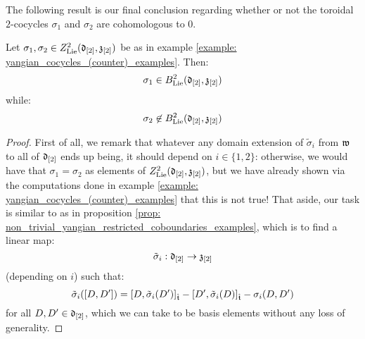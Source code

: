         The following result is our final conclusion regarding whether or not the toroidal $2$-cocycles $\sigma_1$ and $\sigma_2$ are cohomologous to $0$.
        \begin{theorem} \label{theorem: non_trivial_yangian_cocycles_examples}
            Let $\sigma_1, \sigma_2 \in Z^2_{\mathrm{Lie}}(\mathfrak{d}_{[2]}, \mathfrak{z}_{[2]})$ be as in example \ref{example: yangian_cocycles_(counter)_examples}. Then:
                $$\sigma_1 \in B^2_{\mathrm{Lie}}(\mathfrak{d}_{[2]}, \mathfrak{z}_{[2]})$$
            while:
                $$\sigma_2 \not \in B^2_{\mathrm{Lie}}(\mathfrak{d}_{[2]}, \mathfrak{z}_{[2]})$$
        \end{theorem}
            \begin{proof}
                First of all, we remark that whatever any domain extension of $\tilde{\sigma}_i$ from $\mathfrak{w}$ to all of $\mathfrak{d}_{[2]}$ ends up being, it should depend on $i \in \{1, 2\}$: otherwise, we would have that $\sigma_1 = \sigma_2$ as elements of $Z^2_{\mathrm{Lie}}(\mathfrak{d}_{[2]}, \mathfrak{z}_{[2]})$, but we have already shown via the computations done in example \ref{example: yangian_cocycles_(counter)_examples} that this is not true! That aside, our task is similar to as in proposition \ref{prop: non_trivial_yangian_restricted_coboundaries_examples}, which is to find a linear map:
                    $$\tilde{\sigma}_i: \mathfrak{d}_{[2]} \to \mathfrak{z}_{[2]}$$
                (depending on $i$) such that:
                    $$\tilde{\sigma}_i([D, D']) = [D, \tilde{\sigma}_i(D')]_{\hat{\mathfrak{t}}} - [D', \tilde{\sigma}_i(D)]_{\hat{\mathfrak{t}}} - \sigma_i(D, D')$$
                for all $D, D' \in \mathfrak{d}_{[2]}$, which we can take to be basis elements without any loss of generality.


\end{proof}
